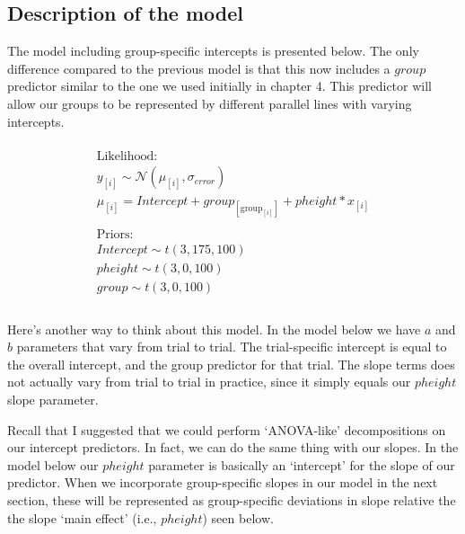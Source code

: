 \documentclass[
]{book}
\begin{document}
\hypertarget{description-of-the-model-5}{%
\subsection{Description of the model}\label{description-of-the-model-5}}

The model including group-specific intercepts is presented below. The only difference compared to the previous model is that this now includes a \(group\) predictor similar to the one we used initially in chapter 4. This predictor will allow our groups to be represented by different parallel lines with varying intercepts.

\begin{equation}
\begin{split}
\\
\textrm{Likelihood:} \\
y_{[i]} \sim \mathcal{N}(\mu_{[i]},\sigma_{error}) \\
\mu_{[i]} = Intercept + group_{[\mathrm{group}_{[i]}]} + pheight * x_{[i]}  \\ \\
\textrm{Priors:} \\
Intercept \sim t(3, 175, 100) \\
pheight \sim t(3, 0, 100) \\ 
group \sim t(3, 0, 100) \\ 
\\
\end{split}
\label{eq:510}
\end{equation}

Here's another way to think about this model. In the model below we have \(a\) and \(b\) parameters that vary from trial to trial. The trial-specific intercept is equal to the overall intercept, and the group predictor for that trial. The slope terms does not actually vary from trial to trial in practice, since it simply equals our \(pheight\) slope parameter.

Recall that I suggested that we could perform `ANOVA-like' decompositions on our intercept predictors. In fact, we can do the same thing with our slopes. In the model below our \(pheight\) parameter is basically an `intercept' for the slope of our predictor. When we incorporate group-specific slopes in our model in the next section, these will be represented as group-specific deviations in slope relative the the slope `main effect' (i.e., \(pheight\)) seen below.
\end{document}
